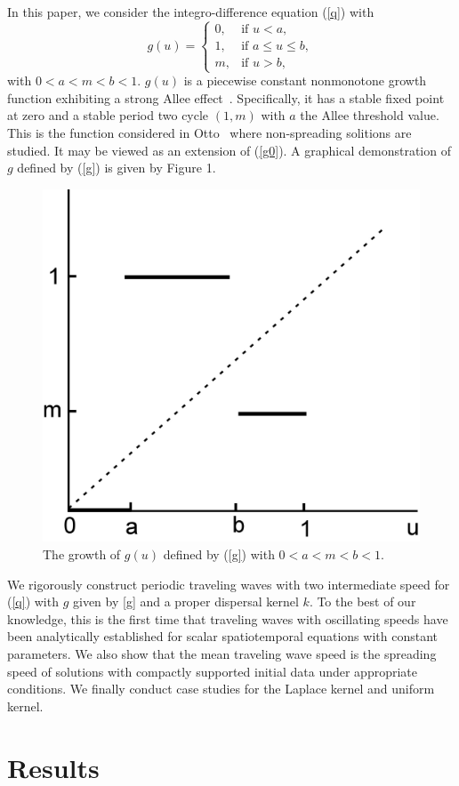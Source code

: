 \documentclass[11pt]{article}
\theoremstyle{definition}
\numberwithin{equation}{section}
\numberwithin{thm}{section}
\renewcommand{\a}{a}
\renewcommand{\b}{b}
\newcommand{\m}{m}
\newcommand{\mtwo}{1}
\begin{document}
In this paper, we consider the integro-difference equation (\ref{q}) with 
\begin{equation} \label{g}
g(u) = \begin{cases}
0, & \text{if } u < \a, \\
\mtwo, & \text{if } \a \leq u \leq \b, \\
\m, & \text{if } u > \b,
\end{cases}
\end{equation}
with $0<\a<\m<\b<1$. $g(u)$ is a piecewise constant nonmonotone growth function exhibiting a strong Allee effect~\cite{all}. Specifically, it has a stable fixed point at zero and a stable period two cycle $(1,\m)$ with $\a$ the Allee threshold value. This is the function considered in Otto~\cite{otto} where non-spreading solitions are studied. It may be viewed as an extension of (\ref{g0}).
  A graphical demonstration of $g$ defined by (\ref{g}) is given by Figure 1. 
\begin{figure}[h!]
\centering
  \caption{The growth of $g(u)$ defined by (\ref{g}) with  $0<\a<\m<\b<1$.}
  \includegraphics[width=.4\linewidth]{figures/fig1.jpg}
\end{figure}
We rigorously construct periodic traveling waves with two intermediate speed for (\ref{q}) with $g$ given by \eqref{g} and a proper dispersal kernel $k$. To the best of our knowledge, this is the first time that traveling waves with oscillating speeds have been analytically established  for scalar spatiotemporal equations with constant parameters. We also show that 
the mean traveling wave speed is  the spreading speed of 
solutions with compactly supported initial data under appropriate conditions.
 We finally conduct case studies for the Laplace kernel and uniform kernel.



\section{Results}
\end{document}
